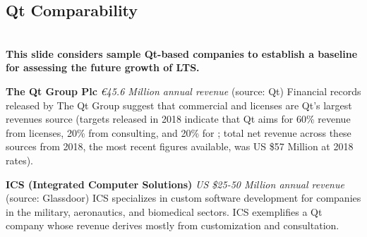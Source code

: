 
\begin{frame}{}
\section{Qt Comparability}
\vspace{.5em}	

{\Large%
\hspace*{-2pt}\begin{minipage}{\textwidth}
\vspace{4pt}


		


{\hspace{1.5em}\begin{minipage}[l]{.9\textwidth}\Large\centering\color{slidePartHeadColor} 	
{}\\\vspace{1em}
{\LARGE \textbf{This slide considers sample Qt-based companies to establish a baseline for assessing 
	the future growth of LTS.}}
\vspace{.7em}	
\end{minipage}}
\vspace{.1em}

{\LARGE \setlength{\leftmargini}{30pt}\begin{enumerate}
\dmitem \textbf{The Qt Group Plc} 
\textit{\euro{}45.6 Million annual revenue} (source: Qt)
Financial records released by The Qt Group suggest that commercial 
 and  licenses 
are Qt's largest revenues source (targets 
released in 2018 indicate that Qt  
aims for 60\% revenue from licenses, 20\% from 
consulting, and 20\% for ; 
total net revenue across these sources from 2018, 
the most recent figures available, was 
US \$57 Million at 2018 rates).\vspace{10pt}

\dmitem \textbf{ICS (Integrated Computer Solutions)} 
\textit{US \$25-50 Million annual revenue} (source: Glassdoor)
ICS specializes in custom software development 
for companies in the military, aeronautics, and 
biomedical sectors.  ICS exemplifies a 
Qt company whose revenue derives mostly from 
customization and consultation.\vspace{10pt}


\end{enumerate}}
\end{minipage}}
\end{frame}
